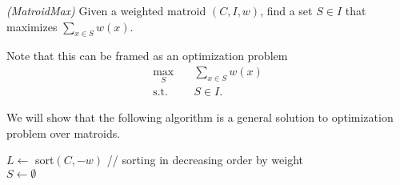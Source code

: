 
\begin{problem}
    \emph{(MatroidMax)} Given a weighted matroid $(C,I,w)$, find a set $S\in I$ that maximizes $\sum_{x\in S} w(x)$.
\end{problem}

Note that this can be framed as an optimization problem
\begin{align*}
    \max_{S} \quad & \sum_{x\in S} w(x) \\
    \textrm{s.t.} \quad & S \in I
.\end{align*}

We will show that the following algorithm is a general solution to optimization problem over matroids.

\begin{algorithm}
    $L\gets $ sort$(C,-w)$  // sorting in decreasing order by weight \\
    $S \gets \emptyset $ \\

\end{algorithm}

